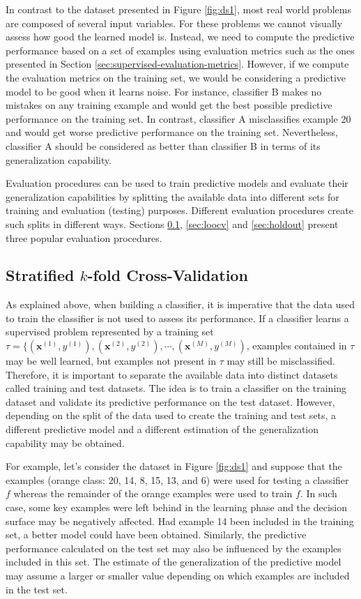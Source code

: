 In contrast to the dataset presented in Figure \ref{fig:ds1}, most real world problems are composed of several input variables. For these problems we cannot visually assess how good the learned model is.  Instead, we need to compute the predictive performance based on a set of examples using evaluation metrics such as the ones presented in Section \ref{sec:supervised-evaluation-metrics}. However, if we compute the evaluation metrics on the training set, we would be considering a predictive model to be good when it learns noise. For instance, classifier B makes no mistakes on any training example and would get the best possible predictive performance on the training set. In contrast, classifier A misclassifies example 20 and would get worse predictive performance on the training set. Nevertheless, classifier A should be considered as better than classifier B in terms of its generalization capability. 

Evaluation procedures can be used to train predictive models and evaluate their generalization capabilities by splitting the available data into different sets for training and evaluation (testing) purposes. Different evaluation procedures create such splits in different ways. Sections \ref{sec:cv}, \ref{sec:loocv} and \ref{sec:holdout} present three popular evaluation procedures.


\subsection{Stratified $k$-fold Cross-Validation}
\label{sec:cv}

As explained above, when building a classifier, it is imperative that the data used to train the classifier is not used to assess its performance. If a classifier learns a supervised problem represented by a training set $\mathcal{\tau} = \{(\mathbf{x}^{(1)}, y^{(1)}), (\mathbf{x}^{(2)}, y^{(2)}), \cdots, (\mathbf{x}^{(M)}, y^{(M)})$, examples contained in $\mathcal{\tau}$ may be well learned, but examples not present in $\mathcal{\tau}$ may still be misclassified. Therefore, it is important to separate the available data into distinct datasets called training and test datasets. The idea is to train a classifier on the training dataset and validate its predictive performance on the test dataset.  However, depending on the split of the data used to create the training and test sets, a different predictive model and a different estimation of the generalization capability may be obtained.

For example, let's consider the dataset in Figure \ref{fig:ds1} and suppose that the examples (orange class: 20, 14, 8, 15, 13, and 6) were used for testing a classifier $f$ whereas the remainder of the orange examples were used to train $f$. In such case, some key examples were left behind in the learning phase and the decision surface may be negatively affected. Had example 14 been included in the training set, a better model could have been obtained. Similarly, the predictive performance calculated on the test set may also be influenced by the examples included in this set. The estimate of the generalization of the predictive model may assume a larger or smaller value depending on which examples are included in the test set.

